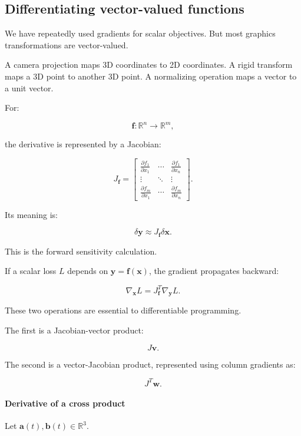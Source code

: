 \subsection{Differentiating vector-valued functions}\label{02-foundations-ii-ch027-differentiating-vector-valued-functions}

We have repeatedly used gradients for scalar objectives. But most graphics transformations are vector-valued.

A camera projection maps 3D coordinates to 2D coordinates. A rigid transform maps a 3D point to another 3D point. A normalizing operation maps a vector to a unit vector.

For:

\[
\mathbf f:\mathbb R^n\rightarrow\mathbb R^m,
\]

the derivative is represented by a Jacobian:

\[
\boxed{ J_{\mathbf f}= \begin{bmatrix} \frac{\partial f_1}{\partial x_1}&\cdots&\frac{\partial f_1}{\partial x_n}\\ \vdots&\ddots&\vdots\\ \frac{\partial f_m}{\partial x_1}&\cdots&\frac{\partial f_m}{\partial x_n} \end{bmatrix} }.
\]

Its meaning is:

\[
\delta\mathbf y\approx J_{\mathbf f}\delta\mathbf x.
\]

This is the forward sensitivity calculation.

If a scalar loss \(L\) depends on \(\mathbf y=\mathbf f(\mathbf x)\), the gradient propagates backward:

\[
\boxed{ \nabla_{\mathbf x}L = J_{\mathbf f}^T\nabla_{\mathbf y}L }.
\]

These two operations are essential to differentiable programming.

The first is a Jacobian-vector product:

\[
J\mathbf v.
\]

The second is a vector-Jacobian product, represented using column gradients as:

\[
J^T\mathbf w.
\]

\paragraph{Derivative of a cross product}\label{02-foundations-ii-ch027-derivative-of-a-cross-product}

Let \(\mathbf a(t),\mathbf b(t)\in\mathbb R^3\).

